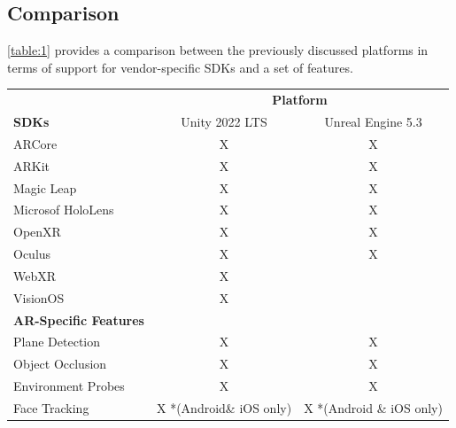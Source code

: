 \documentclass{vgtc}                          %
\begin{document}
\subsection{Comparison}
\autoref{table:1} provides a comparison between the previously discussed
platforms in terms of support for vendor-specific SDKs and a set of features.
\begin{table}
	\centering

	\begin{tabular}{l c c}
		\toprule
		                              & \multicolumn{2}{c}{\textbf{Platform}}                            \\
		\cmidrule(l){2-3}
		\textbf{SDKs}                 & Unity 2022 LTS                        & Unreal Engine 5.3        \\
		\midrule
		ARCore                        & X                                     & X                        \\
		ARKit                         & X                                     & X                        \\
		Magic Leap                    & X                                     & X                        \\
		Microsof HoloLens             & X                                     & X                        \\
		OpenXR                        & X                                     & X                        \\
		Oculus                        & X                                     & X                        \\
		WebXR                         & X                                     &                          \\
		VisionOS                      & X                                     &                          \\
		\midrule
		\textbf{AR-Specific Features} &                                       &                          \\
		\midrule
		Plane Detection               & X                                     & X                        \\
		Object Occlusion              & X                                     & X                        \\
		Environment Probes            & X                                     & X                        \\
		Face Tracking                 & X *(Android\& iOS only)               & X *(Android \& iOS only) \\

\end{tabular}
\end{table}
\end{document}
